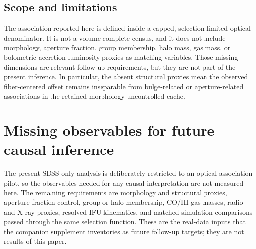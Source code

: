 \documentclass[twocolumn]{aastex631}
\begin{document}
\subsection{Scope and limitations}
The association reported here is defined inside a capped, selection-limited optical denominator. It is not a volume-complete census, and it does not include morphology, aperture fraction, group membership, halo mass, gas mass, or bolometric accretion-luminosity proxies as matching variables. Those missing dimensions are relevant follow-up requirements, but they are not part of the present inference. In particular, the absent structural proxies mean the observed fiber-centered offset remains inseparable from bulge-related or aperture-related associations in the retained morphology-uncontrolled cache.

\section{Missing observables for future causal inference}
The present SDSS-only analysis is deliberately restricted to an optical association pilot, so the observables needed for any causal interpretation are not measured here. The remaining requirements are morphology and structural proxies, aperture-fraction control, group or halo membership, CO/HI gas masses, radio and X-ray proxies, resolved IFU kinematics, and matched simulation comparisons passed through the same selection function. These are the real-data inputs that the companion supplement inventories as future follow-up targets; they are not results of this paper.
\end{document}
